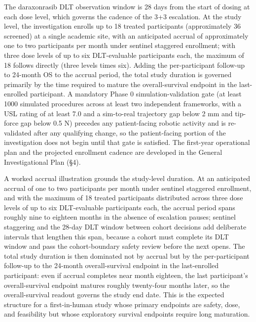 The daraxonrasib DLT observation window is 28 days from the start of dosing at each
dose level, which governs the cadence of the 3+3 escalation. At the study level, the
investigation enrolls up to 18 treated participants (approximately 36 screened) at a
single academic site, with an anticipated accrual of approximately one to two
participants per month under sentinel staggered enrollment; with three dose levels
of up to six DLT-evaluable participants each, the maximum of 18 follows directly
(three levels times six). Adding the per-participant follow-up to 24-month OS to the
accrual period, the total study duration is governed primarily by the time required
to mature the overall-survival endpoint in the last-enrolled participant. A
mandatory Phase 0 simulation-validation gate (at least 1000 simulated procedures
across at least two independent frameworks, with a USL rating of at least 7.0 and a
sim-to-real trajectory gap below 2 mm and tip-force gap below 0.5 N) precedes any
patient-facing robotic activity and is re-validated after any qualifying change, so
the patient-facing portion of the investigation does not begin until that gate is
satisfied. The first-year operational plan and the projected enrollment cadence are
developed in the General Investigational Plan (\S 4).

A worked accrual illustration grounds the study-level duration. At an anticipated
accrual of one to two participants per month under sentinel staggered enrollment, and
with the maximum of 18 treated participants distributed across three dose levels of
up to six DLT-evaluable participants each, the accrual period spans roughly nine to
eighteen months in the absence of escalation pauses; sentinel staggering and the
28-day DLT window between cohort decisions add deliberate intervals that lengthen
this span, because a cohort must complete its DLT window and pass the cohort-boundary
safety review before the next opens. The total study duration is then dominated not
by accrual but by the per-participant follow-up to the 24-month overall-survival
endpoint in the last-enrolled participant: even if accrual completes near month
eighteen, the last participant's overall-survival endpoint matures roughly twenty-four
months later, so the overall-survival readout governs the study end date. This is the
expected structure for a first-in-human study whose primary endpoints are safety,
dose, and feasibility but whose exploratory survival endpoints require long maturation.

